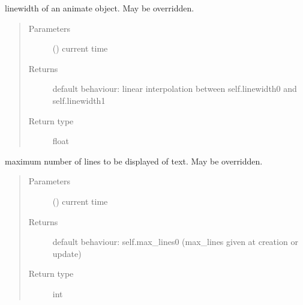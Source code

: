 \documentclass[letterpaper,10pt,english]{sphinxmanual}
\begin{document}
\begin{fulllineitems}

\begin{fulllineitems}
\label{\detokenize{Reference:salabim.Animate.linewidth}}
linewidth of an animate object. May be overridden.
\begin{quote}\begin{description}
\item[{Parameters}] \leavevmode
{} () \textendash{} current time

\item[{Returns}] \leavevmode
{} \textendash{} default behaviour: linear interpolation between self.linewidth0 and self.linewidth1

\item[{Return type}] \leavevmode
float

\end{description}\end{quote}

\end{fulllineitems}


\begin{fulllineitems}
\label{\detokenize{Reference:salabim.Animate.max_lines}}
maximum number of lines to be displayed of text. May be overridden.
\begin{quote}\begin{description}
\item[{Parameters}] \leavevmode
{} () \textendash{} current time

\item[{Returns}] \leavevmode
{} \textendash{} default behaviour: self.max\_lines0 (max\_lines given at creation or update)

\item[{Return type}] \leavevmode
int

\end{description}\end{quote}

\end{fulllineitems}


\end{fulllineitems}
\end{document}
